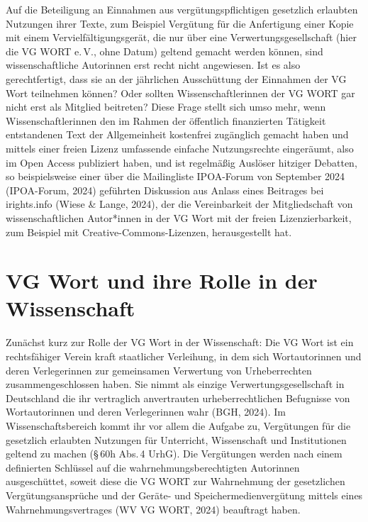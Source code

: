 \documentclass[a4paper,
fontsize=11pt,
oneside,
numbers=noperiodatend,
parskip=half-,
bibliography=totoc,
final
]{scrartcl}
\begin{document}
Auf die Beteiligung an Einnahmen aus vergütungspflichtigen gesetzlich
erlaubten Nutzungen ihrer Texte, zum Beispiel Vergütung für die
Anfertigung einer Kopie mit einem Vervielfältigungsgerät, die nur über
eine Verwertungsgesellschaft (hier die VG WORT e.\,V., ohne Datum)
geltend gemacht werden können, sind wissenschaftliche Autorinnen erst
recht nicht angewiesen. Ist es also gerechtfertigt, dass sie an der
jährlichen Ausschüttung der Einnahmen der VG Wort teilnehmen können?
Oder sollten Wissenschaftlerinnen der VG WORT gar nicht erst als
Mitglied beitreten? Diese Frage stellt sich umso mehr, wenn
Wissenschaftlerinnen den im Rahmen der öffentlich finanzierten Tätigkeit
entstandenen Text der Allgemeinheit kostenfrei zugänglich gemacht haben
und mittels einer freien Lizenz umfassende einfache Nutzungsrechte
eingeräumt, also im Open Access publiziert haben, und ist regelmäßig
Auslöser hitziger Debatten, so beispielsweise einer über die
Mailingliste IPOA-Forum von September 2024 (IPOA-Forum, 2024) geführten
Diskussion aus Anlass eines Beitrages bei irights.info (Wiese \& Lange,
2024), der die Vereinbarkeit der Mitgliedschaft von wissenschaftlichen
Autor*innen in der VG Wort mit der freien Lizenzierbarkeit, zum Beispiel
mit Creative-Commons-Lizenzen, herausgestellt hat.

\hypertarget{vg-wort-und-ihre-rolle-in-der-wissenschaft}{%
\section{VG Wort und ihre Rolle in der
Wissenschaft}\label{vg-wort-und-ihre-rolle-in-der-wissenschaft}}

Zunächst kurz zur Rolle der VG Wort in der Wissenschaft: Die VG Wort ist
ein rechtsfähiger Verein kraft staatlicher Verleihung, in dem sich
Wortautorinnen und deren Verlegerinnen zur gemeinsamen Verwertung von
Urheberrechten zusammengeschlossen haben. Sie nimmt als einzige
Verwertungsgesellschaft in Deutschland die ihr vertraglich anvertrauten
urheberrechtlichen Befugnisse von Wortautorinnen und deren Verlegerinnen
wahr (BGH, 2024). Im Wissenschaftsbereich kommt ihr vor allem die
Aufgabe zu, Vergütungen für die gesetzlich erlaubten Nutzungen für
Unterricht, Wissenschaft und Institutionen geltend zu machen (§\,60h
Abs.\,4 UrhG). Die Vergütungen werden nach einem definierten Schlüssel
auf die wahrnehmungsberechtigten Autorinnen ausgeschüttet, soweit diese
die VG WORT zur Wahrnehmung der gesetzlichen Vergütungsansprüche und der
Geräte- und Speichermedienvergütung mittels eines Wahrnehmungsvertrages
(WV VG WORT, 2024) beauftragt haben.
\end{document}

